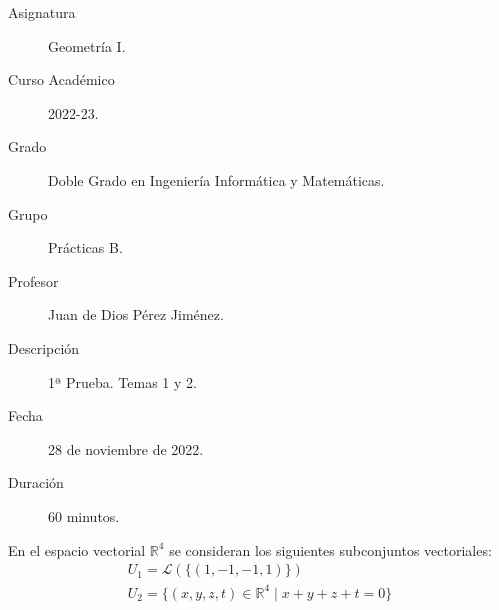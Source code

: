 \documentclass[12pt]{article}
\begin{document}

    
    

    \begin{description}
        \item[Asignatura] Geometría I.
        \item[Curso Académico] 2022-23.
        \item[Grado] Doble Grado en Ingeniería Informática y Matemáticas.
        \item[Grupo] Prácticas B.
        \item[Profesor] Juan de Dios Pérez Jiménez.
        \item[Descripción] 1ª Prueba. Temas 1 y 2.
        \item[Fecha] 28 de noviembre de 2022.
        \item[Duración] 60 minutos.
    
    \end{description}
    \newpage
    
    En el espacio vectorial $\mathbb{R}^4$ se consideran los siguientes subconjuntos vectoriales:
    \begin{gather*}
        U_1=\mathcal{L}(\{(1, -1, -1, 1)\})\\
        U_2 = \{(x, y, z, t) \in \mathbb{R}^4 \mid x+y+z+t=0\}
    \end{gather*}
\end{document}
